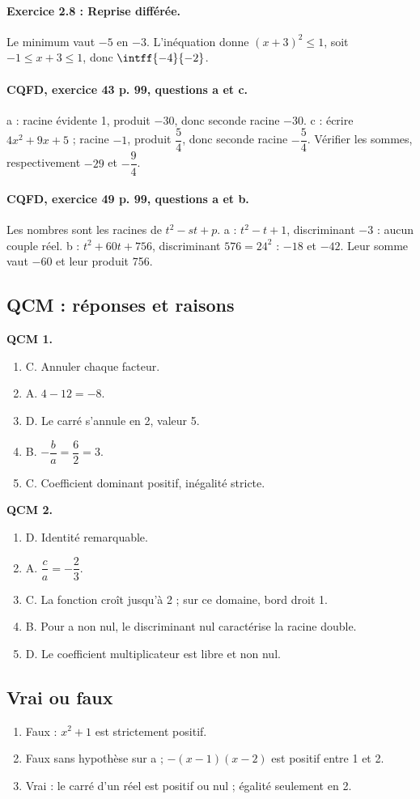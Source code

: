 \paragraph{Exercice 2.8 : Reprise différée.} Le minimum vaut $-5$ en $-3$. L’inéquation donne $(x+3)^2\leq1$, soit $-1\leq x+3\leq1$, donc $\intff{-4}{-2}$.
\paragraph{CQFD, exercice 43 p. 99, questions a et c.} a : racine évidente 1, produit $-30$, donc seconde racine $-30$. c : écrire $4x^2+9x+5$ ; racine $-1$, produit $\dfrac54$, donc seconde racine $-\dfrac54$. Vérifier les sommes, respectivement $-29$ et $-\dfrac94$.
\paragraph{CQFD, exercice 49 p. 99, questions a et b.} Les nombres sont les racines de $t^2-st+p$. a : $t^2-t+1$, discriminant $-3$ : aucun couple réel. b : $t^2+60t+756$, discriminant $576=24^2$ : $-18$ et $-42$. Leur somme vaut $-60$ et leur produit 756.
\subsection*{QCM : réponses et raisons}
\textbf{QCM 1.}
\begin{enumerate}
\item C. Annuler chaque facteur.
\item A. $4-12=-8$.
\item D. Le carré s’annule en 2, valeur 5.
\item B. $-\dfrac{b}{a}=\dfrac{6}{2}=3$.
\item C. Coefficient dominant positif, inégalité stricte.
\end{enumerate}
\textbf{QCM 2.}
\begin{enumerate}
\item D. Identité remarquable.
\item A. $\dfrac{c}{a}=-\dfrac{2}{3}$.
\item C. La fonction croît jusqu’à 2 ; sur ce domaine, bord droit 1.
\item B. Pour a non nul, le discriminant nul caractérise la racine double.
\item D. Le coefficient multiplicateur est libre et non nul.
\end{enumerate}
\subsection*{Vrai ou faux}
\begin{enumerate}
\item Faux : $x^2+1$ est strictement positif.
\item Faux sans hypothèse sur a ; $-(x-1)(x-2)$ est positif entre 1 et 2.
\item Vrai : le carré d’un réel est positif ou nul ; égalité seulement en 2.
\end{enumerate}
